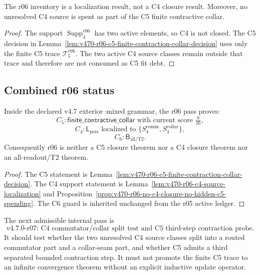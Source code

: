 \begin{proposition}
\label{prop:v470-r06-no-c4-closure-no-hidden-c5-spending}
The r06 inventory is a localization result, not a C4 closure result.  Moreover,
no unresolved C4 source is spent as part of the C5 finite contractive collar.
\end{proposition}

\begin{proof}
The support \(\operatorname{Supp}_{4}^{r06}\) has two active elements, so C4 is
not closed.  The C5 decision in Lemma~\ref{lem:v470-r06-c5-finite-contraction-collar-decision}
uses only the finite C5 trace \(\mathcal T_{5}^{r06}\).  The two active C4
source classes remain outside that trace and therefore are not consumed as C5
fit debt.
\end{proof}

\subsection{Combined r06 status}
\label{subsec:v470-r06-combined-status}

\begin{theorem}
\label{thm:v470-r06-c5-collar-c4-inventory}
Inside the declared v4.7 exterior--mixed grammar, the r06 pass proves:
\[
C_5:\mathsf{finite\_contractive\_collar}\text{ with current score }\tfrac{9}{16},
\]
\[
C_4:\mathsf L_{\mathrm{pers}}\text{ localized to }
\{S_4^{\mathrm{comm}},S_4^{\mathrm{collar}}\},
\]
\[
C_6:\mathsf B_{\mathrm{all/T2}}.
\]
Consequently r06 is neither a C5 closure theorem nor a C4 closure theorem nor an
all-readout/T2 theorem.
\end{theorem}

\begin{proof}
The C5 statement is Lemma~\ref{lem:v470-r06-c5-finite-contraction-collar-decision}.
The C4 support statement is Lemma~\ref{lem:v470-r06-c4-source-localization} and
Proposition~\ref{prop:v470-r06-no-c4-closure-no-hidden-c5-spending}.  The C6
guard is inherited unchanged from the r05 active ledger.
\end{proof}

\begin{corollary}
\label{cor:v470-r06-permitted-r07-direction}
The next admissible internal pass is
\[
\text{v4.7.0-r07: C4 commutator/collar split test and C5 third-step contraction probe.}
\]
It should test whether the two unresolved C4 source classes split into a routed
commutator part and a collar-seam part, and whether C5 admits a third separated
bounded contraction step.  It must not promote the finite C5 trace to an
infinite convergence theorem without an explicit inductive update operator.
\end{corollary}

